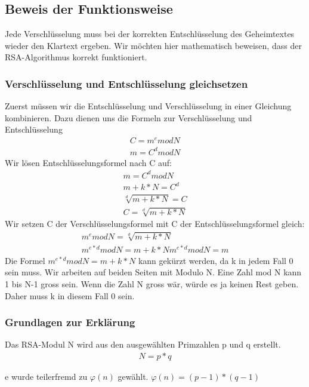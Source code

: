 \subsection{Beweis der Funktionsweise}
Jede Verschlüsselung muss bei der korrekten Entschlüsselung des Geheimtextes wieder den Klartext ergeben. Wir möchten hier mathematisch beweisen, dass der RSA-Algorithmus korrekt funktioniert.\\

\subsubsection{Verschlüsselung und Entschlüsselung gleichsetzen}
Zuerst müssen wir die Entschlüsselung und Verschlüsselung in einer Gleichung kombinieren. Dazu dienen uns die Formeln zur Verschlüsselung und Entschlüsselung\\
\begin{align}
  C = m^e mod N \\
  m = C^d mod N
\end{align}
Wir lösen Entschlüsselungsformel nach C auf:
\begin{align}
  m = C^d mod N \\
  m + k * N = C^d \\
  \sqrt[d]{m+k*N} = C \\
  C = \sqrt[d]{m+k*N}
\end{align}
Wir setzen C der Verschlüsselungsformel mit C der Entschlüsselungsformel gleich:
\begin{align}
  m^e mod N = \sqrt[d]{m+k*N}\\
  m^{e*d} mod N = m + k * N
  m^{e*d} mod N = m
\end{align}
Die Formel $ m^{e*d} mod N = m + k * N $ kann gekürzt werden, da k in jedem Fall 0 sein muss. Wir arbeiten auf beiden Seiten mit Modulo N. Eine Zahl mod N kann 1 bis N-1 gross sein.
Wenn die Zahl N gross wär, würde es ja keinen Rest geben. Daher muss k in diesem Fall 0 sein. 


\subsubsection{Grundlagen zur Erklärung}
Das RSA-Modul N wird aus den ausgewählten Primzahlen p und q erstellt.
\begin{align}
  N = p * q
\end{align}

e wurde teilerfremd zu $ \varphi(n) $ gewählt. 
$ \varphi(n) = (p-1)*(q-1) $

